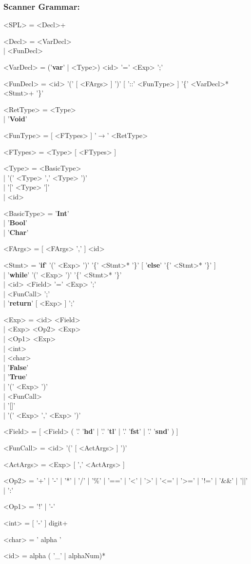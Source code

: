 \documentclass{article}
\begin{document}
\subsubsection*{Scanner Grammar:}
\begin{grammar}
	<SPL> = <Decl>+

	<Decl> = <VarDecl> \\| <FunDecl>

	<VarDecl> = ('\textbf{var}' | <Type>) <id> '=' <Exp> ';'

	<FunDecl> = <id> '(' [ <FArgs> ] ')' [ '::' <FunType> ] '\{' <VarDecl>* <Stmt>+ '\}'

	<RetType> = <Type> \\| '\textbf{Void}'

	<FunType> = [ <FTypes> ] '$\rightarrow$' <RetType>

	<FTypes> = <Type> [ <FTypes> ]

	<Type> = <BasicType> \\| '(' <Type> ',' <Type> ')' \\| '[' <Type> ']' \\| <id>

	<BasicType> = '\textbf{Int}' \\| '\textbf{Bool}' \\| '\textbf{Char}'

	<FArgs> = [ <FArgs> ',' ] <id>

	<Stmt> = '\textbf{if}' '(' <Exp> ')' '\{' <Stmt>* '\}' [ '\textbf{else}' '\{' <Stmt>* '\}' ] \\| '\textbf{while}' '(' <Exp> ')' '\{' <Stmt>* '\}' \\| <id> <Field> '=' <Exp> ';' \\| <FunCall> ';' \\| '\textbf{return}' [ <Exp> ] ';'

	<Exp> = <id> <Field> \\| <Exp> <Op2> <Exp> \\| <Op1> <Exp> \\| <int> \\| <char> \\| '\textbf{False}' \\| '\textbf{True}' \\| '(' <Exp> ')' \\| <FunCall> \\| '[]' \\| '(' <Exp> ',' <Exp> ')'

	<Field> = [ <Field> ( '.' '\textbf{hd}' | '.' '\textbf{tl}' | '.' '\textbf{fst}' | '.' '\textbf{snd}' ) ]

	<FunCall> = <id> '(' [ <ActArgs> ] ')'

	<ActArgs> = <Exp> [ ',' <ActArgs> ]

	<Op2> = '+' | '-' | '*' | '/' | '\%' | '==' | '\textless' | '\textgreater' | '\textless=' | '\textgreater=' | '!=' | '\&\&' | '||' | ':'

	<Op1> = '!' | '-'

	<int> = [ '-' ] digit+

	<char> = ' alpha '

	<id> = alpha ( '\_' | alphaNum)*
\end{grammar}
\end{document}
